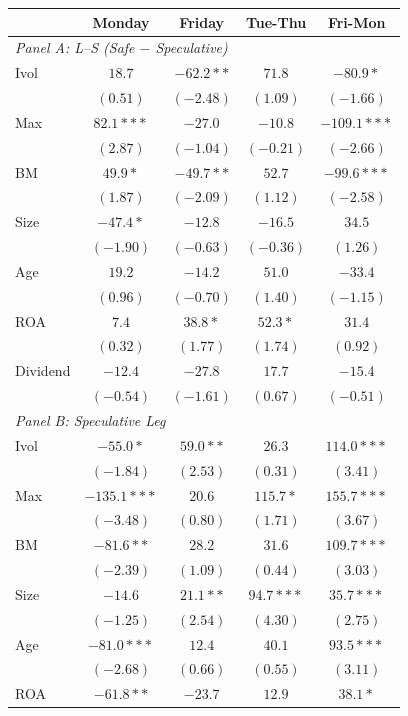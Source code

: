 \centering
\footnotesize
\begin{tabular}{l c c c c}
\toprule
 & Monday & Friday & Tue-Thu & Fri-Mon \\
\midrule
\multicolumn{5}{l}{\textit{Panel A: L--S (Safe $-$ Speculative)}} \\
Ivol & $18.7$ & $-62.2**$ & $71.8$ & $-80.9*$ \\
 & $(0.51)$ & $(-2.48)$ & $(1.09)$ & $(-1.66)$ \\
Max & $82.1***$ & $-27.0$ & $-10.8$ & $-109.1***$ \\
 & $(2.87)$ & $(-1.04)$ & $(-0.21)$ & $(-2.66)$ \\
BM & $49.9*$ & $-49.7**$ & $52.7$ & $-99.6***$ \\
 & $(1.87)$ & $(-2.09)$ & $(1.12)$ & $(-2.58)$ \\
Size & $-47.4*$ & $-12.8$ & $-16.5$ & $34.5$ \\
 & $(-1.90)$ & $(-0.63)$ & $(-0.36)$ & $(1.26)$ \\
Age & $19.2$ & $-14.2$ & $51.0$ & $-33.4$ \\
 & $(0.96)$ & $(-0.70)$ & $(1.40)$ & $(-1.15)$ \\
ROA & $7.4$ & $38.8*$ & $52.3*$ & $31.4$ \\
 & $(0.32)$ & $(1.77)$ & $(1.74)$ & $(0.92)$ \\
Dividend & $-12.4$ & $-27.8$ & $17.7$ & $-15.4$ \\
 & $(-0.54)$ & $(-1.61)$ & $(0.67)$ & $(-0.51)$ \\
\midrule
\multicolumn{5}{l}{\textit{Panel B: Speculative Leg}} \\
Ivol & $-55.0*$ & $59.0**$ & $26.3$ & $114.0***$ \\
 & $(-1.84)$ & $(2.53)$ & $(0.31)$ & $(3.41)$ \\
Max & $-135.1***$ & $20.6$ & $115.7*$ & $155.7***$ \\
 & $(-3.48)$ & $(0.80)$ & $(1.71)$ & $(3.67)$ \\
BM & $-81.6**$ & $28.2$ & $31.6$ & $109.7***$ \\
 & $(-2.39)$ & $(1.09)$ & $(0.44)$ & $(3.03)$ \\
Size & $-14.6$ & $21.1**$ & $94.7***$ & $35.7***$ \\
 & $(-1.25)$ & $(2.54)$ & $(4.30)$ & $(2.75)$ \\
Age & $-81.0***$ & $12.4$ & $40.1$ & $93.5***$ \\
 & $(-2.68)$ & $(0.66)$ & $(0.55)$ & $(3.11)$ \\
ROA & $-61.8**$ & $-23.7$ & $12.9$ & $38.1*$ \\

\end{tabular}
